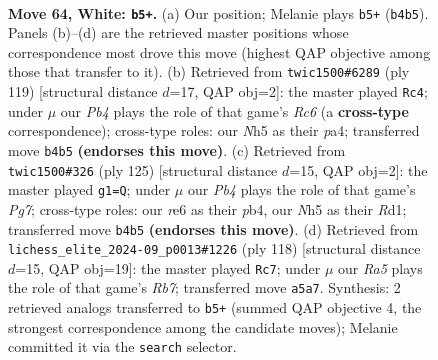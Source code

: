 \documentclass[11pt]{article}
\begin{document}
\clearpage

\begin{figure}[p]\centering
\begin{subfigure}{0.46\textwidth}\centering
\resizebox{\linewidth}{!}{%
\newchessgame
\chessboard[
  setfen={8/8/2k1r3/R6N/1P3p2/8/6P1/1K6 w - - 0 64},
  showmover=false,
  pgfstyle=straightmove, color=movearrow, markmove={b4-b5}
]}
\caption{}
\end{subfigure}\hfill
\begin{subfigure}{0.46\textwidth}\centering
\resizebox{\linewidth}{!}{%
\newchessgame
\chessboard[
  setfen={8/3k4/1K5R/p7/P4P2/2r5/8/8 b - - 0 60},
  showmover=false,
  pgfstyle=straightmove, color=movearrow, markmove={c3-c4}
]}
\caption{}
\end{subfigure}
\\[4pt]
\begin{subfigure}{0.46\textwidth}\centering
\resizebox{\linewidth}{!}{%
\newchessgame
\chessboard[
  setfen={8/1P6/2R3Kp/8/1P4k1/8/6p1/3r4 b - - 0 63},
  showmover=false,
  pgfstyle=straightmove, color=movearrow, markmove={g2-g1}
]}
\caption{}
\end{subfigure}\hfill
\begin{subfigure}{0.46\textwidth}\centering
\resizebox{\linewidth}{!}{%
\newchessgame
\chessboard[
  setfen={4k3/1R6/r3p3/6N1/5P2/4K3/8/8 w - - 26 60},
  showmover=false,
  pgfstyle=straightmove, color=movearrow, markmove={b7-c7}
]}
\caption{}
\end{subfigure}
\caption{\textbf{Move 64, White: \texttt{b5+}.} (a) Our position; Melanie plays \texttt{b5+} (\texttt{b4b5}). Panels (b)--(d) are the retrieved master positions whose correspondence most drove this move (highest QAP objective among those that transfer to it). (b) Retrieved from \texttt{twic1500\#6289} (ply 119) [structural distance $d$=17, QAP obj=2]: the master played \texttt{Rc4}; under $\mu$ our \emph{Pb4} plays the role of that game's \emph{Rc6} (a \textbf{cross-type} correspondence); cross-type roles: our \emph{N}h5 as their \emph{p}a4; transferred move \texttt{b4b5} \textbf{(endorses this move)}. (c) Retrieved from \texttt{twic1500\#326} (ply 125) [structural distance $d$=15, QAP obj=2]: the master played \texttt{g1=Q}; under $\mu$ our \emph{Pb4} plays the role of that game's \emph{Pg7}; cross-type roles: our \emph{r}e6 as their \emph{p}b4, our \emph{N}h5 as their \emph{R}d1; transferred move \texttt{b4b5} \textbf{(endorses this move)}. (d) Retrieved from \texttt{lichess\_elite\_2024-09\_p0013\#1226} (ply 118) [structural distance $d$=15, QAP obj=19]: the master played \texttt{Rc7}; under $\mu$ our \emph{Ra5} plays the role of that game's \emph{Rb7}; transferred move \texttt{a5a7}. Synthesis: 2 retrieved analogs transferred to \texttt{b5+} (summed QAP objective 4, the strongest correspondence among the candidate moves); Melanie committed it via the \texttt{search} selector.}
\label{fig:thought-m126}
\end{figure}
\end{document}
